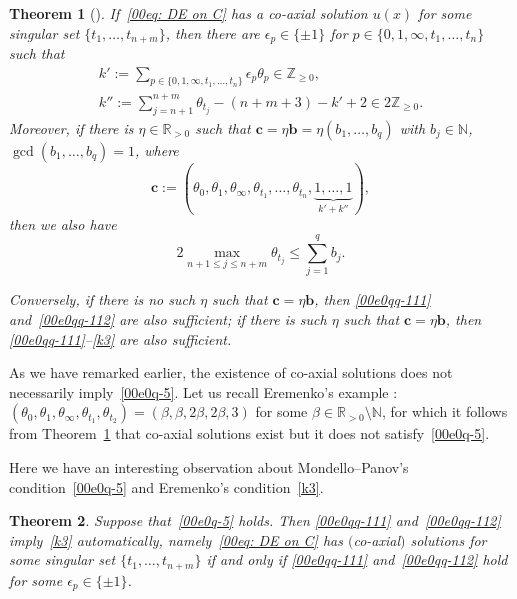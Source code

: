 \documentclass[pdftex]{sigma}
\numberwithin{equation}{section}
\newtheorem{Theorem}{Theorem}[section]
\def\N{\mathbb N}
\begin{document}
\begin{Theorem}[\cite{Coaxial}]\label{thm-Eremenko}
If~\eqref{00eq: DE on C} has a co-axial solution $u(x)$ for some singular set $\{t_1,\dots,t_{n+m}\}$, then
 there are $\epsilon_{p}\in\{\pm 1\}$ for $p\in
 \{0,1,\infty,t_1,\dots,t_n\}$ such that
\begin{gather}
k':=\sum_{p\in\{0,1,\infty,t_1,\dots,t_n\}} \epsilon_{p}\theta_{p}\in\mathbb{Z}_{\geq 0},\label{00e0qq-111}
\\
k'':=\sum_{j=n+1}^{n+m} \theta_{t_j}-(n+m+3)-k'+2\in 2\mathbb{Z}_{\geq 0}.\label{00e0qq-112}
\end{gather}
Moreover, if there is $\eta\in\mathbb{R}_{>0}$ such that
$\mathbf{c}=\eta\mathbf{b}=\eta(b_1,\dots,b_q)$ with
$b_j\in\mathbb{N}$, $\gcd(b_1,\dots,b_q)=1$, where
\[
 \boldsymbol c:=(\theta_0,\theta_1,\theta_\infty,\theta_{t_1},
 \dots,\theta_{t_n},\underbrace{1,\dots,1}_{k'+k''}),
\]
then we also have
\begin{equation}\label{k3}
 2\max_{n+1\leq j\leq {n+m}}\theta_{t_j}\leq \sum_{j=1}^q b_j.
\end{equation}



Conversely, if there is no such $\eta$ such that
$\mathbf{c}=\eta\mathbf{b}$, then
\eqref{00e0qq-111} and~\eqref{00e0qq-112} are also sufficient; if there
is such $\eta$ such that $\mathbf{c}=\eta\mathbf{b}$, then
\eqref{00e0qq-111}--\eqref{k3} are also sufficient.
\end{Theorem}

As we have remarked earlier, the existence of co-axial solutions does
not necessarily imply~\eqref{00e0q-5}. Let us recall Eremenko's
example \cite{Coaxial}:
$(\theta_0,\theta_1,\theta_\infty,\theta_{t_1},\theta_{t_2})=(\beta,\beta,2\beta,2\beta,3)$
for some $\beta\in\mathbb{R}_{>0}\setminus\N$, for which it follows
from Theorem~\ref{thm-Eremenko} that co-axial solutions exist but it
does not satisfy~\eqref{00e0q-5}.

Here we have an interesting observation about Mondello--Panov's
condition~\eqref{00e0q-5} and Eremenko's condition~\eqref{k3}.

\begin{Theorem}\label{thm-MP-E}
Suppose that~\eqref{00e0q-5} holds. Then
\eqref{00e0qq-111} and~\eqref{00e0qq-112} imply~\eqref{k3} automatically,
namely~\eqref{00eq: DE on C} has $($co-axial$)$ solutions for some
singular set $\{t_1,\dots,t_{n+m}\}$ if and only if
\eqref{00e0qq-111} and~\eqref{00e0qq-112} hold for some
$\epsilon_p\in\{\pm 1\}$.
\end{Theorem}
\end{document}
